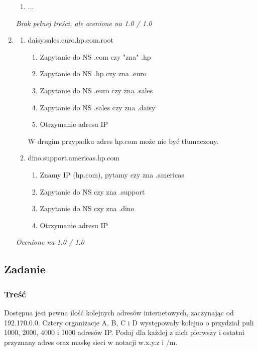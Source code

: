 \begin{enumerate}[A]
\begin{enumerate}[1]
					\item ...
				\end{enumerate}
				\small{ \emph{Brak pełnej treści, ale ocenione na 1.0 / 1.0}}
				\item
					\begin{enumerate}
						\item daisy.sales.euro.hp.com.root
						\begin{enumerate}[1]
							\item Zapytanie do NS .com czy "zna" .hp
							\item Zapytanie do NS .hp czy zna .euro
							\item Zapytanie do NS .euro czy zna .sales
							\item Zapytanie do NS .sales czy zna .daisy
							\item Otrzymanie adresu IP
						\end{enumerate}
						W drugim przypadku adres hp.com może nie być tłumaczony.
						\item dino.support.americas.hp.com
						\begin{enumerate}[1]
							\item Znamy IP (hp.com), pytamy czy zna .americas
							\item Zapytanie do NS czy zna .support
							\item Zapytanie do NS czy zna .dino
							\item Otrzymanie adresu IP
						\end{enumerate}
					\end{enumerate}
					\small{ \emph{Ocenione na 1.0 / 1.0}}
			\end{enumerate}
	\subsection{Zadanie}
		\subsubsection{Treść}
			Dostępna jest pewna ilość kolejnych adresów internetowych, zaczynając od 192.170.0.0. Cztery organizacje A, B, C i D występowały kolejno o przydział puli 1000, 2000, 4000 i 1000 adresów IP. Podaj dla każdej z nich pierwszy i ostatni przyznany adres oraz maskę sieci w notacji w.x.y.z i /m.
